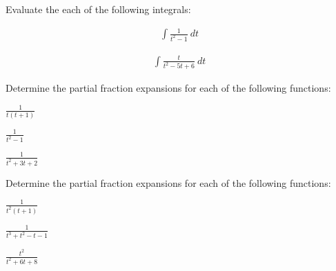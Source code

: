 

\begin{problem}
\item Evaluate the each of the following integrals:

  \begin{subproblem}
  \item 
    \begin{eqnarray}
      \int \frac{1}{t^2-1} ~ dt 
    \end{eqnarray}
    \vfill

  \item 
    \begin{eqnarray}
      \int \frac{t}{t^2-5t+6} ~ dt
    \end{eqnarray}
    \vfill

  \end{subproblem}
\end{problem}


\begin{problem}
\item Determine the partial fraction expansions for each of the following functions:

  \begin{subproblem}
  \item $\frac{1}{t(t+1)}$
    \vfill
  \item $\frac{1}{t^2-1}$
    \vfill
  \item $\frac{1}{t^2+3t+2}$
    \vfill
  \end{subproblem}


  \clearpage
\item Determine the partial fraction expansions for each of the following functions:

  \begin{subproblem}
  \item $\frac{1}{t^2(t+1)}$
    \vfill
  \item $\frac{1}{t^3+t^2-t-1}$
    \vfill
  \item $\frac{t^2}{t^2+6t+8}$
    \vfill
  \end{subproblem}


\end{problem}


